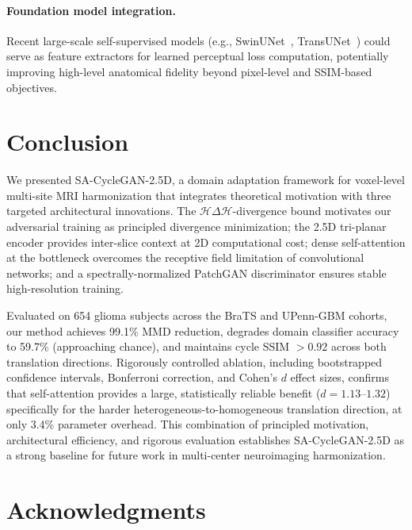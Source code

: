 \documentclass{article}
\begin{document}
\paragraph{Foundation model integration.}
Recent large-scale self-supervised models (e.g., SwinUNet~\cite{cao2022swinunet},
TransUNet~\cite{chen2021transunet}) could serve as feature extractors for learned
perceptual loss computation, potentially improving high-level anatomical fidelity
beyond pixel-level and SSIM-based objectives.

\section{Conclusion}
\label{sec:conclusion}

We presented SA-CycleGAN-2.5D, a domain adaptation framework for voxel-level multi-site
MRI harmonization that integrates theoretical motivation with three targeted architectural
innovations. The $\mathcal{H}\Delta\mathcal{H}$-divergence bound motivates our adversarial
training as principled divergence minimization; the 2.5D tri-planar encoder provides
inter-slice context at 2D computational cost; dense self-attention at the bottleneck
overcomes the receptive field limitation of convolutional networks; and a
spectrally-normalized PatchGAN discriminator ensures stable high-resolution training.

Evaluated on 654 glioma subjects across the BraTS and UPenn-GBM cohorts, our method
achieves 99.1\% MMD reduction, degrades domain classifier accuracy to 59.7\% (approaching
chance), and maintains cycle SSIM $> 0.92$ across both translation directions. Rigorously
controlled ablation, including bootstrapped confidence intervals, Bonferroni correction, and
Cohen's $d$ effect sizes, confirms that self-attention provides a large, statistically
reliable benefit ($d{=}1.13\text{--}1.32$) specifically for the harder heterogeneous-to-homogeneous
translation direction, at only 3.4\% parameter overhead. This combination of principled
motivation, architectural efficiency, and rigorous evaluation establishes SA-CycleGAN-2.5D
as a strong baseline for future work in multi-center neuroimaging harmonization.

\section*{Acknowledgments}
\end{document}
